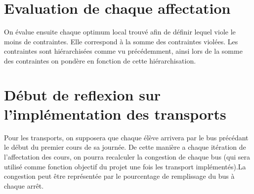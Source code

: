 \documentclass[a4paper,11pt]{article}
\begin{document}
\section{Evaluation de chaque affectation}
	On évalue ensuite chaque optimum local trouvé afin de définir lequel viole le moins de contraintes. Elle correspond à la somme des contraintes violées. Les contraintes sont hiérarchisées comme vu précédemment, ainsi lors de la somme des contraintes on pondère en fonction de cette hiérarchisation.
	
\section{Début de reflexion sur l'implémentation des transports}
	Pour les transports, on supposera que chaque élève arrivera par le bus précédant le début du premier cours de sa journée. De cette manière a chaque itération de l'affectation des cours, on pourra recalculer la congestion de chaque bus (qui sera utilisé comme fonction objectif du projet une fois les transport implémentés).La congestion peut être représentée par le pourcentage de remplissage du bus à chaque arrêt. 
\end{document}
